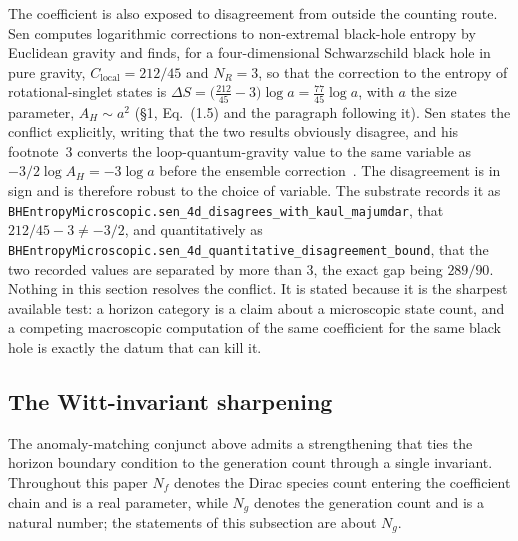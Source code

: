 \documentclass[aps,prd,nofootinbib,superscriptaddress,12pt]{revtex4-2}
\DeclareRobustCommand{\lb}{\discretionary{}{}{}}
\begin{document}
The coefficient is also exposed to disagreement from outside the counting route. Sen
computes logarithmic corrections to non-extremal black-hole entropy by Euclidean gravity and
finds, for a four-dimensional Schwarzschild black hole in pure gravity, $C_{\mathrm{local}}
= 212/45$ and $N_R = 3$, so that the correction to the entropy of rotational-singlet states
is $\Delta S = \bigl(\tfrac{212}{45} - 3\bigr)\log a = \tfrac{77}{45}\log a$, with $a$ the
size parameter, $A_H \sim a^{2}$ (\S1, Eq.~(1.5) and the paragraph following it). Sen states
the conflict explicitly, writing that the two results obviously disagree, and his footnote~3
converts the loop-quantum-gravity value to the same variable as $-3/2\log A_H = -3\log a$
before the ensemble correction~\cite{Sen2013Schwarzschild}. The disagreement is in sign and is therefore
robust to the choice of variable. The substrate records it as
\texttt{BHEntropy\lb{}Microscopic.\lb{}sen\_\lb{}4d\_\lb{}disagrees\_\lb{}with\_\lb{}kaul\_\lb{}majumdar}, that
$212/45 - 3 \neq -3/2$, and quantitatively as
\texttt{BHEntropy\lb{}Microscopic.\lb{}sen\_\lb{}4d\_\lb{}quantitative\_\lb{}disagreement\_\lb{}bound}, that the two
recorded values are separated by more than $3$, the exact gap being $289/90$. Nothing in
this section resolves the conflict. It is stated because it is the sharpest available test:
a horizon category is a claim about a microscopic state count, and a competing macroscopic
computation of the same coefficient for the same black hole is exactly the datum that can
kill it.

\subsection{The Witt-invariant sharpening}
\label{sec:entropy-witt}

The anomaly-matching conjunct above admits a strengthening that ties the horizon boundary
condition to the generation count through a single invariant. Throughout this paper $N_f$
denotes the Dirac species count entering the coefficient chain and is a real parameter,
while $N_g$ denotes the generation count and is a natural number; the statements of this
subsection are about $N_g$.
\end{document}
